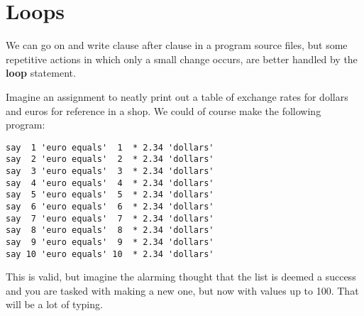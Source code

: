 {\section{Loops}
We can go on and write clause after clause in a program source files,
but some repetitive actions in which only a small change occurs, are
better handled by the \textbf{loop} statement.




Imagine an assignment to neatly print out a table of exchange rates for
dollars and euros for reference in a shop. We could of course make the
following program:
\begin{lstlisting}[label=withoutloop,caption=Without a loop]
say  1 'euro equals'  1  * 2.34 'dollars'
say  2 'euro equals'  2  * 2.34 'dollars'
say  3 'euro equals'  3  * 2.34 'dollars'
say  4 'euro equals'  4  * 2.34 'dollars'
say  5 'euro equals'  5  * 2.34 'dollars'
say  6 'euro equals'  6  * 2.34 'dollars'
say  7 'euro equals'  7  * 2.34 'dollars'
say  8 'euro equals'  8  * 2.34 'dollars'
say  9 'euro equals'  9  * 2.34 'dollars'
say 10 'euro equals' 10  * 2.34 'dollars'
\end{lstlisting}
This is valid, but imagine the alarming thought that the list is deemed
a success and you are tasked with making a new one, but now with
values up to 100. That will be a lot of typing.

}

